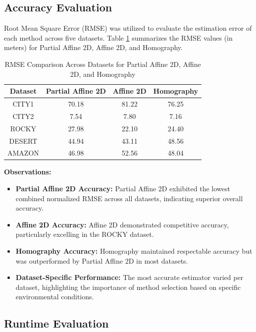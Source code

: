 \subsection{Accuracy Evaluation}

Root Mean Square Error (RMSE) was utilized to evaluate the estimation error of each method across five datasets. Table \ref{tab:rmse_comparison_rotestim} summarizes the RMSE values (in meters) for Partial Affine 2D, Affine 2D, and Homography.

\begin{table}[H]
    \centering
    \caption{RMSE Comparison Across Datasets for Partial Affine 2D, Affine 2D, and Homography}
    \label{tab:rmse_comparison_rotestim}
    \begin{tabular}{|c|c|c|c|}
    \hline
    \textbf{Dataset} & \textbf{Partial Affine 2D} & \textbf{Affine 2D} & \textbf{Homography} \\ \hline
    CITY1   & 70.18 & 81.22 & 76.25 \\ \hline
    CITY2   & 7.54  & 7.80  & 7.16  \\ \hline
    ROCKY   & 27.98 & 22.10 & 24.40 \\ \hline
    DESERT  & 44.94 & 43.11 & 48.56 \\ \hline
    AMAZON  & 46.98 & 52.56 & 48.04 \\ \hline
    \end{tabular}
\end{table}

\textbf{Observations:}  
\begin{itemize}
    \item \textbf{Partial Affine 2D Accuracy:} Partial Affine 2D exhibited the lowest combined normalized RMSE across all datasets, indicating superior overall accuracy.
    \item \textbf{Affine 2D Accuracy:} Affine 2D demonstrated competitive accuracy, particularly excelling in the ROCKY dataset.
    \item \textbf{Homography Accuracy:} Homography maintained respectable accuracy but was outperformed by Partial Affine 2D in most datasets.
    \item \textbf{Dataset-Specific Performance:} The most accurate estimator varied per dataset, highlighting the importance of method selection based on specific environmental conditions.
\end{itemize}

\subsection{Runtime Evaluation}

